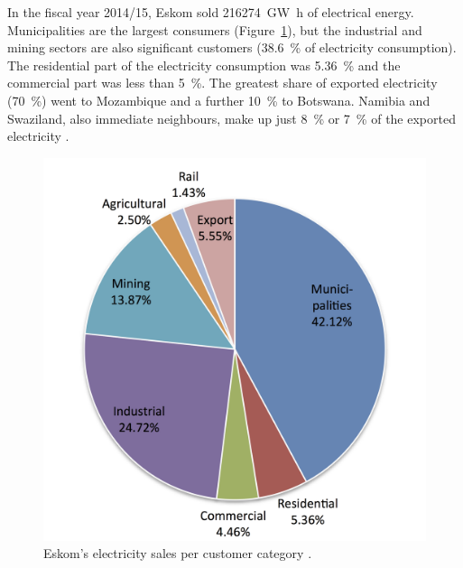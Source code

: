 In the fiscal year 2014/15, Eskom sold \SI{216274}{\giga\watt\hour} of electrical energy. Municipalities are the largest consumers (Figure~\ref{ElectricityShare}), but the industrial and mining sectors are also significant customers (\SI{38.6}{\percent} of electricity consumption). The residential part of the electricity consumption was \SI{5.36}{\percent} and the commercial part was less than \SI{5}{\percent}. The greatest share of exported electricity (\SI{70}{\percent}) went to Mozambique and a further \SI{10}{\percent} to Botswana. Namibia and Swaziland, also immediate neighbours, make up just \SI{8}{\percent} or \SI{7}{\percent} of the exported electricity \cite{Eskom2015b}.
\begin{figure}[!h] 
\centering
\includegraphics[width=0.5\linewidth]{FIG/ElectricityShare}
\caption[Eskom's electricity sales per customer category.]{Eskom's electricity sales per customer category \cite{Eskom2015b}.}\label{ElectricityShare}
\end{figure}
\pagebreak
